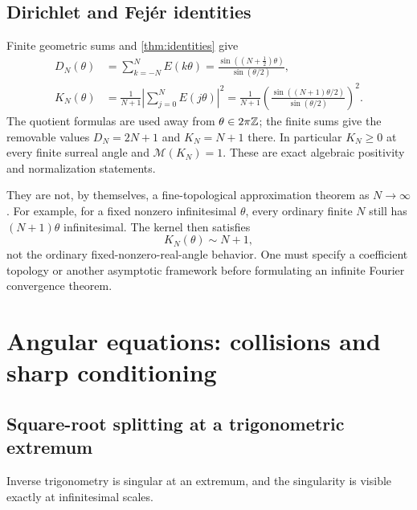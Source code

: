 \documentclass[11pt,letterpaper]{article}
\theoremstyle{definition}
\theoremstyle{remark}
\numberwithin{equation}{section}
\begin{document}
\subsection{Dirichlet and Fej\'er identities}
Finite geometric sums and \cref{thm:identities} give
\begin{align}
 D_N(\theta)&=\sum_{k=-N}^{N}E(k\theta)
 =\frac{\sin((N+\tfrac12)\theta)}{\sin(\theta/2)},
 \label{eq:dirichlet}\\
 K_N(\theta)&=\frac1{N+1}\left|\sum_{j=0}^{N}E(j\theta)\right|^2
 =\frac1{N+1}\left(\frac{\sin((N+1)\theta/2)}{\sin(\theta/2)}\right)^2.
 \label{eq:fejerkernel}
\end{align}
The quotient formulas are used away from $\theta\in2\pi\mathbb Z$; the finite sums give the removable values $D_N=2N+1$ and $K_N=N+1$ there. In particular $K_N\ge0$ at every finite surreal angle and $\mathcal M(K_N)=1$. These are exact algebraic positivity and normalization statements.

They are not, by themselves, a fine-topological approximation theorem as $N\to\infty$. For example, for a fixed nonzero infinitesimal $\theta$, every ordinary finite $N$ still has $(N+1)\theta$ infinitesimal. The kernel then satisfies
\[
 K_N(\theta)\sim N+1,
\]
not the ordinary fixed-nonzero-real-angle behavior. One must specify a coefficient topology or another asymptotic framework before formulating an infinite Fourier convergence theorem.

\section{Angular equations: collisions and sharp conditioning}\label{sec:roots}
\subsection{Square-root splitting at a trigonometric extremum}
Inverse trigonometry is singular at an extremum, and the singularity is visible exactly at infinitesimal scales.
\end{document}
